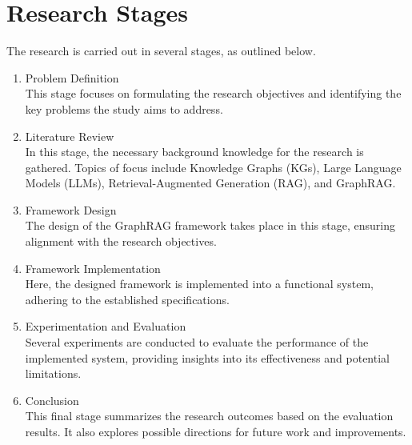 \section{Research Stages}
\label{sec:langkahPenelitian}
The research is carried out in several stages, as outlined below.

\begin{enumerate}
    \item Problem Definition \\
    This stage focuses on formulating the research objectives and identifying the key problems the study aims to address.

    \item Literature Review \\
    In this stage, the necessary background knowledge for the research is gathered. Topics of focus include Knowledge Graphs (KGs), Large Language Models (LLMs), Retrieval-Augmented Generation (RAG), and GraphRAG.

    \item Framework Design \\
    The design of the GraphRAG framework takes place in this stage, ensuring alignment with the research objectives.

    \item Framework Implementation \\
    Here, the designed framework is implemented into a functional system, adhering to the established specifications.

    \item Experimentation and Evaluation \\
    Several experiments are conducted to evaluate the performance of the implemented system, providing insights into its effectiveness and potential limitations.

    \item Conclusion \\
    This final stage summarizes the research outcomes based on the evaluation results. It also explores possible directions for future work and improvements.
\end{enumerate}



